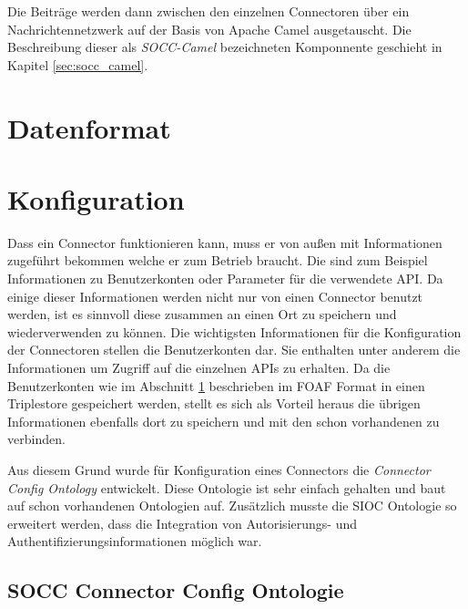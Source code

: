 Die Beiträge werden dann zwischen den einzelnen Connectoren über ein Nachrichtennetzwerk auf der Basis von Apache Camel ausgetauscht. Die Beschreibung dieser als \emph{SOCC-Camel} bezeichneten Komponnente geschieht in Kapitel \ref{sec:socc_camel}.

\section{Datenformat} %
\label{sec:datenformat}



\section{Konfiguration} %
\label{sec:konfiguration}

Dass ein Connector funktionieren kann, muss er von außen mit Informationen zugeführt bekommen welche er zum Betrieb braucht. Die sind zum Beispiel Informationen zu Benutzerkonten oder Parameter für die verwendete API. Da einige dieser Informationen werden nicht nur von einen Connector benutzt werden, ist es sinnvoll diese zusammen an einen Ort zu speichern und wiederverwenden zu können. Die wichtigsten Informationen für die Konfiguration der Connectoren stellen die Benutzerkonten dar. Sie enthalten unter anderem die Informationen um Zugriff auf die einzelnen APIs zu erhalten. Da die Benutzerkonten wie im Abschnitt \ref{sec:datenformat} beschrieben im FOAF Format in einen Triplestore gespeichert werden, stellt es sich als Vorteil heraus die übrigen Informationen ebenfalls dort zu speichern und mit den schon vorhandenen zu verbinden. 

Aus diesem Grund wurde für Konfiguration eines Connectors die \emph{Connector Config Ontology} entwickelt. Diese Ontologie ist sehr einfach gehalten und baut auf schon vorhandenen Ontologien auf. Zusätzlich musste die SIOC Ontologie so erweitert werden, dass die Integration von Autorisierungs- und Authentifizierungsinformationen möglich war. 

\subsection{SOCC Connector Config Ontologie} %
\label{sub:connector_config_ontologie}

